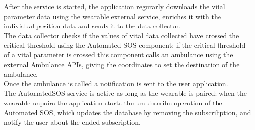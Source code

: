 After the service is started, the application regurarly downloads the vital parameter data using the wearable external service, enriches it with the individual position data and sends it to the data collector.\\
The data collector checks if the values of vital data collected have crossed the critical threshold using the Automated SOS component: if the critical threshold of a vital parameter is crossed this component calls an ambulance using the external Ambulance APIs, giving the coordinates to set the destination of the ambulance.\\
Once the ambulance is called a notification is sent to the user application.\\
The AutomatedSOS service is active as long as the wearable is paired: when the wearable unpairs the application starts the unsubscribe operation of the Automated SOS, which updates the database by removing the subscribption, and notify the user about the ended subscription.



